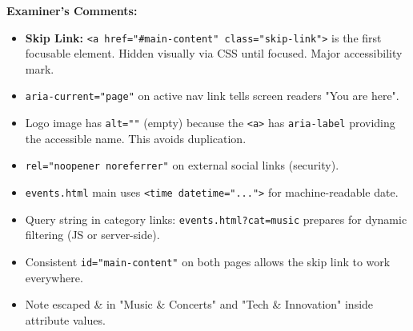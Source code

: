 \documentclass[11pt]{article}
\begin{document}
\begin{exoresolu}
\textbf{Examiner's Comments:}
\begin{itemize}
    \item \textbf{Skip Link:} \texttt{<a href="\#main-content" class="skip-link">} is the first focusable element. Hidden visually via CSS until focused. Major accessibility mark.
    \item \texttt{aria-current="page"} on active nav link tells screen readers "You are here".
    \item Logo image has \texttt{alt=""} (empty) because the \texttt{<a>} has \texttt{aria-label} providing the accessible name. This avoids duplication.
    \item \texttt{rel="noopener noreferrer"} on external social links (security).
    \item \texttt{events.html} main uses \texttt{<time datetime="...">} for machine-readable date.
    \item Query string in category links: \texttt{events.html?cat=music} \textemdash prepares for dynamic filtering (JS or server-side).
    \item Consistent \texttt{id="main-content"} on both pages allows the skip link to work everywhere.
    \item Note escaped \& in "Music \& Concerts" and "Tech \& Innovation" inside attribute values.
\end{itemize}
\end{exoresolu}
\end{document}
